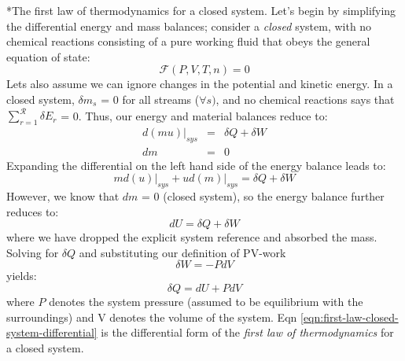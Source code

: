 \documentclass[11pt]{article}
\makeatletter
\theoremstyle{definition}
\renewcommand\subsection{\@startsection
	{subsection}{2}{0mm}
	{-0.05in}
	{0.5\baselineskip}
	{\normalfont\normalsize\bfseries}}
\makeatother
\begin{document}
\subsection*{The first law of thermodynamics for a closed system.}
Let's begin by simplifying the differential energy and mass balances;
consider a \textit{closed} system, with no chemical reactions consisting of a pure working fluid that obeys the general equation of state:
\begin{equation}
	\mathcal{F}\left(P,V,T,n\right) = 0
\end{equation}Lets also assume we can ignore changes in the potential and kinetic energy.
In a closed system, $\delta{m}_{s}$ = 0 for all streams ($\forall{s})$, and no chemical reactions says that $\sum_{r=1}^{\mathcal{R}}\delta E_{r}$ = 0. Thus, our energy and material balances reduce to:
\begin{eqnarray}\label{eqn:energy-balance-precursor-internal}
d\left(mu\right)\Bigr|_{sys} &=& \delta{Q}+\delta{W}\\\label{eqn:material-balance-precursor-internal}
dm &=& 0
\end{eqnarray}
Expanding the differential on the left hand side of the energy balance leads to:
\begin{equation}
md\left(u\right)\Bigr|_{sys}+ud\left(m\right)\Bigr|_{sys} = \delta{Q}+\delta{W}
\end{equation}However, we know that $dm$ = 0 (closed system), so the energy balance further reduces to:
\begin{equation}\label{eqn:almost-first-law}
dU = \delta{Q}+\delta{W}
\end{equation}where we have dropped the explicit system reference and absorbed the mass.
Solving for $\delta{Q}$ and substituting our definition of PV-work
\begin{equation}
\delta{W} = - PdV
\end{equation}
yields:
\begin{equation}\label{eqn:first-law-closed-system-differential}
	\delta{Q} = dU + PdV
\end{equation}where $P$ denotes the system pressure (assumed to be equilibrium with the surroundings) and V denotes the volume of the system.
Eqn \eqref{eqn:first-law-closed-system-differential} is the differential form of the \textit{first law of thermodynamics} for a closed system.
\end{document}
